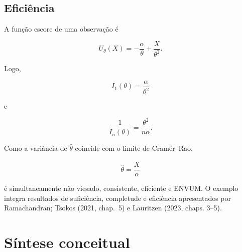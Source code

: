 \documentclass[
  letterpaper,
  DIV=11,
  numbers=noendperiod]{scrreprt}
\begin{document}
\subsection*{Eficiência}\label{eficiuxeancia}

A função escore de uma observação é

\[U_\theta(X)
=
-\frac{\alpha}{\theta}
+
\frac{X}{\theta^2}.\]

Logo,

\[I_1(\theta)
=
\frac{\alpha}{\theta^2}\]

e

\[\frac{1}{I_n(\theta)}
=
\frac{\theta^2}{n\alpha}.\]

Como a variância de \(\widehat{\theta}\) coincide com o limite de
Cramér--Rao,

\[\boxed{
\widehat{\theta}
=
\frac{\overline{X}}{\alpha}
}\]

é simultaneamente não viesado, consistente, eficiente e ENVUM. O exemplo
integra resultados de suficiência, completude e eficiência apresentados
por Ramachandran; Tsokos (2021, chap.~5) e Lauritzen (2023, chaps.
3--5).

\section{Síntese conceitual}\label{suxedntese-conceitual}
\end{document}
